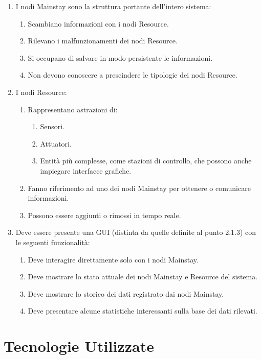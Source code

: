 \documentclass[12pt,a4paper,openright,twoside]{book}
\begin{document}
\begin{enumerate}
    \item I nodi Mainstay sono la struttura portante dell'intero sistema:
    \begin{enumerate}
        \item Scambiano informazioni con i nodi Resource.
        \item Rilevano i malfunzionamenti dei nodi Resource.
        \item Si occupano di salvare in modo persistente le informazioni.
        \item Non devono conoscere a prescindere le tipologie dei nodi Resource.
    \end{enumerate}
    \item I nodi Resource:
    \begin{enumerate}
        \item Rappresentano astrazioni di:
        \begin{enumerate}
            \item Sensori.
            \item Attuatori.
            \item Entità più complesse, come stazioni di controllo, che possono anche impiegare interfacce grafiche.
        \end{enumerate}
        \item Fanno riferimento ad uno dei nodi Mainstay per ottenere o comunicare informazioni.
        \item Possono essere aggiunti o rimossi in tempo reale.
    \end{enumerate}
    \item Deve essere presente una GUI (distinta da quelle definite al punto 2.1.3) con le seguenti funzionalità:
    \begin{enumerate}
        \item Deve interagire direttamente solo con i nodi Mainstay.
        \item Deve mostrare lo stato attuale dei nodi Mainstay e Resource del sistema.
        \item Deve mostrare lo storico dei dati registrato dai nodi Mainstay.
        \item Deve presentare alcune statistiche interessanti sulla base dei dati rilevati.
    \end{enumerate}
\end{enumerate}

\section{Tecnologie Utilizzate}
\end{document}
